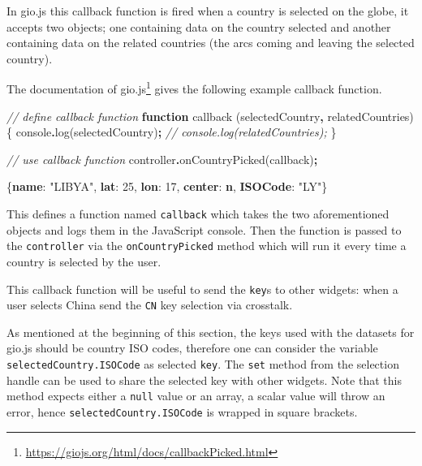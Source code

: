 \documentclass[
]{krantz}
\makeatletter
\newenvironment{Shaded}{\begin{snugshade}}{\end{snugshade}}
\newcommand{\BuiltInTok}[1]{#1}
\newcommand{\CommentTok}[1]{\textcolor[rgb]{0.37,0.37,0.37}{\textit{#1}}}
\newcommand{\DecValTok}[1]{\textcolor[rgb]{0.06,0.06,0.06}{#1}}
\newcommand{\ErrorTok}[1]{\textcolor[rgb]{0.14,0.14,0.14}{\textbf{#1}}}
\newcommand{\FunctionTok}[1]{\textcolor[rgb]{0,0,0}{#1}}
\newcommand{\KeywordTok}[1]{\textcolor[rgb]{0.27,0.27,0.27}{\textbf{#1}}}
\newcommand{\NormalTok}[1]{#1}
\newcommand{\OperatorTok}[1]{\textcolor[rgb]{0.43,0.43,0.43}{\textbf{#1}}}
\newcommand{\StringTok}[1]{\textcolor[rgb]{0.5,0.5,0.5}{#1}}
\renewcommand{\href}[2]{#2\footnote{\url{#1}}}
\newenvironment{kframe}{%
\medskip{}
\setlength{\fboxsep}{.8em}
 \def\at@end@of@kframe{}%
 \ifinner\ifhmode%
  \def\at@end@of@kframe{\end{minipage}}%
  \begin{minipage}{\columnwidth}%
 \fi\fi%
 \def\FrameCommand##1{\hskip\@totalleftmargin \hskip-\fboxsep
 \colorbox{shadecolor}{##1}\hskip-\fboxsep
     \hskip-\linewidth \hskip-\@totalleftmargin \hskip\columnwidth}%
 \MakeFramed {\advance\hsize-\width
   \@totalleftmargin\z@ \linewidth\hsize
   \@setminipage}}%
 {\par\unskip\endMakeFramed%
 \at@end@of@kframe}
\renewenvironment{Shaded}{\begin{kframe}}{\end{kframe}}
\makeatother
\begin{document}
In gio.js this callback function is fired when a country is selected on the globe, it accepts two objects; one containing data on the country selected and another containing data on the related countries (the arcs coming and leaving the selected country).

The \href{https://giojs.org/html/docs/callbackPicked.html}{documentation of gio.js} gives the following example callback function.

\begin{Shaded}
\begin{Highlighting}[]
\CommentTok{// define callback function}
\KeywordTok{function} \FunctionTok{callback}\NormalTok{ (selectedCountry}\OperatorTok{,}\NormalTok{ relatedCountries) \{}
  \BuiltInTok{console}\OperatorTok{.}\FunctionTok{log}\NormalTok{(selectedCountry)}\OperatorTok{;}
  \CommentTok{// console.log(relatedCountries);}
\NormalTok{\}}

\CommentTok{// use callback function}
\NormalTok{controller}\OperatorTok{.}\FunctionTok{onCountryPicked}\NormalTok{(callback)}\OperatorTok{;}
\end{Highlighting}
\end{Shaded}

\begin{Shaded}
\begin{Highlighting}[]
\FunctionTok{\{}\ErrorTok{name}\FunctionTok{:} \StringTok{"LIBYA"}\FunctionTok{,} \ErrorTok{lat}\FunctionTok{:} \DecValTok{25}\FunctionTok{,} \ErrorTok{lon}\FunctionTok{:} \DecValTok{17}\FunctionTok{,} \ErrorTok{center}\FunctionTok{:} \ErrorTok{n}\FunctionTok{,} \ErrorTok{ISOCode}\FunctionTok{:} \StringTok{"LY"}\FunctionTok{\}}
\end{Highlighting}
\end{Shaded}

This defines a function named \texttt{callback} which takes the two aforementioned objects and logs them in the JavaScript console. Then the function is passed to the \texttt{controller} via the \texttt{onCountryPicked} method which will run it every time a country is selected by the user.

This callback function will be useful to send the \texttt{key}s to other widgets: when a user selects China send the \texttt{CN} key selection via crosstalk.

As mentioned at the beginning of this section, the keys used with the datasets for gio.js should be country ISO codes, therefore one can consider the variable \texttt{selectedCountry.ISOCode} as selected \texttt{key}. The \texttt{set} method from the selection handle can be used to share the selected key with other widgets. Note that this method expects either a \texttt{null} value or an array, a scalar value will throw an error, hence \texttt{selectedCountry.ISOCode} is wrapped in square brackets.
\end{document}
